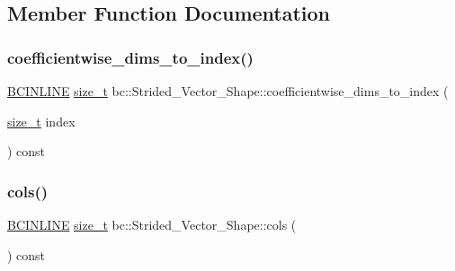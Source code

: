 \subsection{Member Function Documentation}
\mbox{\label{structbc_1_1Strided__Vector__Shape_ac4fa697e990136ae9e5a69f8c67db19d}} 
\subsubsection{\texorpdfstring{coefficientwise\+\_\+dims\+\_\+to\+\_\+index()}{coefficientwise\_dims\_to\_index()}}
{\footnotesize\ttfamily \hyperlink{common_8h_a6699e8b0449da5c0fafb878e59c1d4b1}{B\+C\+I\+N\+L\+I\+NE} \hyperlink{namespacebc_aaf8e3fbf99b04b1b57c4f80c6f55d3c5}{size\+\_\+t} bc\+::\+Strided\+\_\+\+Vector\+\_\+\+Shape\+::coefficientwise\+\_\+dims\+\_\+to\+\_\+index (\begin{DoxyParamCaption}\item[{\hyperlink{namespacebc_aaf8e3fbf99b04b1b57c4f80c6f55d3c5}{size\+\_\+t}}]{index }\end{DoxyParamCaption}) const\hspace{0.3cm}{\ttfamily [inline]}}

\mbox{\label{structbc_1_1Strided__Vector__Shape_ace499a1da27a005b036a0cb8e5a43b4e}} 
\subsubsection{\texorpdfstring{cols()}{cols()}}
{\footnotesize\ttfamily \hyperlink{common_8h_a6699e8b0449da5c0fafb878e59c1d4b1}{B\+C\+I\+N\+L\+I\+NE} \hyperlink{namespacebc_aaf8e3fbf99b04b1b57c4f80c6f55d3c5}{size\+\_\+t} bc\+::\+Strided\+\_\+\+Vector\+\_\+\+Shape\+::cols (\begin{DoxyParamCaption}{ }\end{DoxyParamCaption}) const\hspace{0.3cm}{\ttfamily [inline]}}

